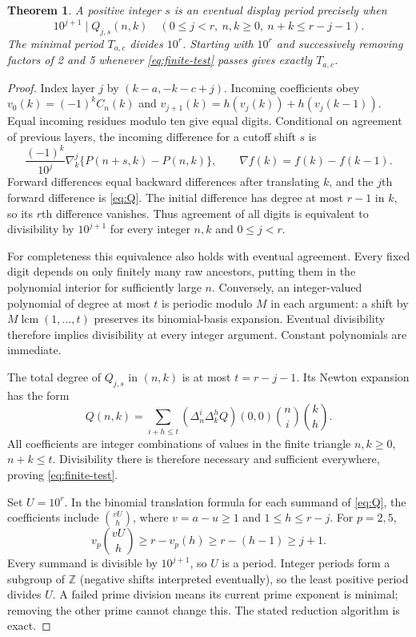\documentclass[11pt]{article}
\newtheorem{theorem}{Theorem}[section]
\newcommand{\Z}{\mathbb Z}
\begin{document}
\begin{theorem}\label{thm:period}
A positive integer $s$ is an eventual display period precisely when
\begin{equation}\label{eq:finite-test}
 10^{j+1}\mid Q_{j,s}(n,k)
 \quad(0\le j<r,\ n,k\ge0,\ n+k\le r-j-1).
\end{equation}
The minimal period $T_{a,c}$ divides $10^r$. Starting with $10^r$ and
successively removing factors of 2 and 5 whenever \eqref{eq:finite-test}
passes gives exactly $T_{a,c}$.
\end{theorem}
\begin{proof}
Index layer $j$ by $(k-a,-k-c+j)$. Incoming coefficients obey
$v_0(k)=(-1)^kC_n(k)$ and
$v_{j+1}(k)=h(v_j(k))+h(v_j(k-1))$.
Equal incoming residues modulo ten give equal digits. Conditional on
agreement of previous layers, the incoming difference for a cutoff shift
$s$ is
\[
 \frac{(-1)^k}{10^j}\nabla_k^j\{P(n+s,k)-P(n,k)\},
 \qquad \nabla f(k)=f(k)-f(k-1).
\]
Forward differences equal backward differences after translating $k$,
and the $j$th forward difference is \eqref{eq:Q}. The initial difference
has degree at most $r-1$ in $k$, so its $r$th difference vanishes.
Thus agreement of all digits is equivalent to divisibility by $10^{j+1}$
for every integer $n,k$ and $0\le j<r$.

For completeness this equivalence also holds with eventual agreement.
Every fixed digit depends on only finitely many raw ancestors, putting
them in the polynomial interior for sufficiently large $n$. Conversely,
an integer-valued polynomial of degree at most $t$ is periodic modulo $M$
in each argument: a shift by $M\operatorname{lcm}(1,\ldots,t)$ preserves
its binomial-basis expansion. Eventual divisibility therefore implies
divisibility at every integer argument. Constant polynomials are immediate.

The total degree of $Q_{j,s}$ in $(n,k)$ is at most $t=r-j-1$.
Its Newton expansion has the form
\[
 Q(n,k)=\sum_{i+h\le t}(\Delta_n^i\Delta_k^hQ)(0,0)
                   \binom ni\binom kh.
\]
All coefficients are integer combinations of values in the finite triangle
$n,k\ge0$, $n+k\le t$. Divisibility there is therefore necessary and
sufficient everywhere, proving \eqref{eq:finite-test}.

Set $U=10^r$. In the binomial translation formula for each summand of
\eqref{eq:Q}, the coefficients include $\binom{vU}{h}$, where
$v=a-u\ge1$ and $1\le h\le r-j$. For $p=2,5$,
\[
 v_p\binom{vU}{h}\ge r-v_p(h)\ge r-(h-1)\ge j+1.
\]
Every summand is divisible by $10^{j+1}$, so $U$ is a period. Integer
periods form a subgroup of $\Z$ (negative shifts interpreted eventually),
so the least positive period divides $U$. A failed prime division means
its current prime exponent is minimal; removing the other prime cannot
change this. The stated reduction algorithm is exact.
\end{proof}
\end{document}
